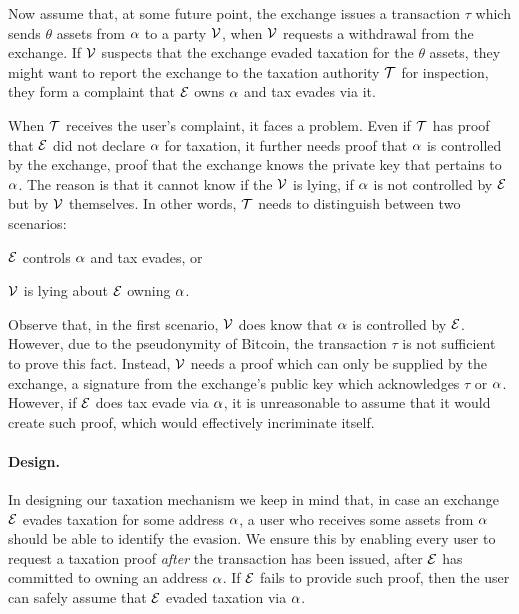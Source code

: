 Now assume that, at some future point, the exchange issues a transaction $\tau$
which sends $\theta$ assets from $\alpha$ to a party $\mathcal{V}$, \eg when
$\mathcal{V}$ requests a withdrawal from the exchange. If $\mathcal{V}$ suspects that the
exchange evaded taxation for the $\theta$ assets, they might want to report the
exchange to the taxation authority $\mathcal{T}$ for inspection, \ie they form a
complaint that $\mathcal{E}$ owns $\alpha$ and tax evades via it.

When $\mathcal{T}$ receives the user's complaint, it faces a problem. Even if
$\mathcal{T}$ has proof that $\mathcal{E}$ did not declare $\alpha$ for taxation,
it further needs proof that $\alpha$ is controlled by the exchange, \ie proof
that the exchange knows the private key that pertains to $\alpha$. The reason
is that it cannot know if the $\mathcal{V}$ is lying, \ie if $\alpha$ is not
controlled by $\mathcal{E}$ but by $\mathcal{V}$ themselves. In other words, $\mathcal{T}$
needs to distinguish between two scenarios:
\begin{inparaenum}[i)]
    \item $\mathcal{E}$ controls $\alpha$ and tax evades, or
    \item $\mathcal{V}$ is lying about $\mathcal{E}$ owning $\alpha$.
\end{inparaenum}

Observe that, in the first scenario, $\mathcal{V}$ does know that $\alpha$ is
controlled by $\mathcal{E}$. However, due to the pseudonymity of Bitcoin, the
transaction $\tau$ is not sufficient to prove this fact. Instead, $\mathcal{V}$
needs a proof which can only be supplied by the exchange, \eg a signature from
the exchange's public key which acknowledges $\tau$ or $\alpha$. However, if
$\mathcal{E}$ does tax evade via $\alpha$, it is unreasonable to assume that it
would create such proof, which would effectively incriminate itself.

\paragraph{Design.}

In designing our taxation mechanism we keep in mind that, in case an exchange
$\mathcal{E}$ evades taxation for some address $\alpha$, a user who receives
some assets from $\alpha$ should be able to identify the evasion.  We ensure
this by enabling every user to request a taxation proof \emph{after} the
transaction has been issued, \ie after $\mathcal{E}$ has committed to owning an
address $\alpha$. If $\mathcal{E}$ fails to provide such proof, then the user
can safely assume that $\mathcal{E}$ evaded taxation via $\alpha$.

